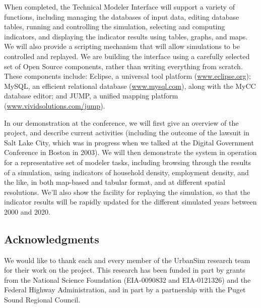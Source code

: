 \documentclass[11pt]{article}
\begin{document}
When completed, the Technical Modeler Interface will support a variety of
functions, including managing the databases of input data, editing database
tables, running and controlling the simulation, selecting and computing
indicators, and displaying the indicator results using tables, graphs, and
maps.  We will also provide a scripting mechanism that will allow
simulations to be controlled and replayed.  We are building the interface
using a carefully selected set of Open Source components, rather than
writing everything from scratch.  These components include: Eclipse, a
universal tool platform (\url{www.eclipse.org}); MySQL, an efficient
relational database (\url{www.mysql.com}), along with the MyCC database
editor; and JUMP, a unified mapping platform
(\url{www.vividsolutions.com/jump}).

In our demonstration at the conference, we will first give an overview of
the project, and describe current activities (including the outcome of the
lawsuit in Salt Lake City, which was in progress when we talked at the
Digital Government Conference in Boston in 2003).  We will then demonstrate
the system in operation for a representative set of modeler tasks,
including browsing through the results of a simulation, using indicators of
household density, employment density, and the like, in both map-based and
tabular format, and at different spatial resolutions.  We'll also show the
facility for replaying the simulation, so that the indicator results will
be rapidly updated for the different simulated years between 2000 and 2020.

\subsection*{Acknowledgments}

We would like to thank each and every member of the UrbanSim research team
for their work on the project.  This research has been funded in part by
grants from the National Science Foundation (EIA-0090832 and EIA-0121326)
and the Federal Highway Administration, and in part by a partnership with
the Puget Sound Regional Council.



\end{document}
